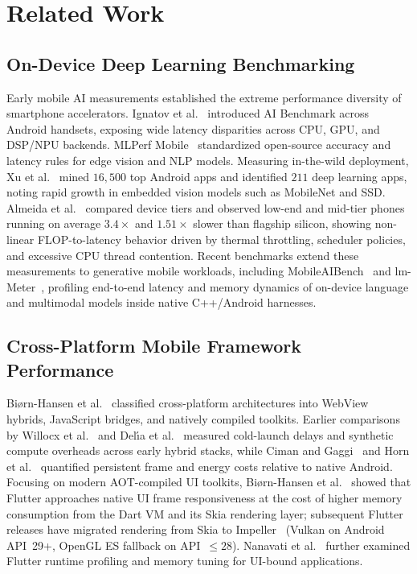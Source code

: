 \section{Related Work}\label{sec:related}

\subsection{On-Device Deep Learning Benchmarking}
Early mobile AI measurements established the extreme performance diversity of smartphone accelerators. Ignatov et al.~\cite{ignatov2018ai,ignatov2019ai} introduced AI Benchmark across Android handsets, exposing wide latency disparities across CPU, GPU, and DSP/NPU backends. MLPerf Mobile~\cite{reddi2020mlperf,reddi2022mlperfmobile} standardized open-source accuracy and latency rules for edge vision and NLP models. Measuring in-the-wild deployment, Xu et al.~\cite{xu2019first} mined $16{,}500$ top Android apps and identified $211$ deep learning apps, noting rapid growth in embedded vision models such as MobileNet and SSD. Almeida et al.~\cite{almeida2021smart} compared device tiers and observed low-end and mid-tier phones running on average $3.4\times$ and $1.51\times$ slower than flagship silicon, showing non-linear FLOP-to-latency behavior driven by thermal throttling, scheduler policies, and excessive CPU thread contention. Recent benchmarks extend these measurements to generative mobile workloads, including MobileAIBench~\cite{murthy2024mobileaibench} and lm-Meter~\cite{wang2025lmmeter}, profiling end-to-end latency and memory dynamics of on-device language and multimodal models inside native C++/Android harnesses.

\subsection{Cross-Platform Mobile Framework Performance}
Bi{\o}rn-Hansen et al.~\cite{biornhansen2019survey} classified cross-platform architectures into WebView hybrids, JavaScript bridges, and natively compiled toolkits. Earlier comparisons by Willocx et al.~\cite{willocx2016comparing} and Del{\'\i}a et al.~\cite{delia2015multi} measured cold-launch delays and synthetic compute overheads across early hybrid stacks, while Ciman and Gaggi~\cite{ciman2017empirical} and Horn et al.~\cite{horn2023native} quantified persistent frame and energy costs relative to native Android. Focusing on modern AOT-compiled UI toolkits, Bi{\o}rn-Hansen et al.~\cite{biornhansen2020empirical} showed that Flutter approaches native UI frame responsiveness at the cost of higher memory consumption from the Dart VM and its Skia rendering layer; subsequent Flutter releases have migrated rendering from Skia to Impeller~\cite{flutterimpeller2025} (Vulkan on Android API~29+, OpenGL ES fallback on API~$\le 28$). Nanavati et al.~\cite{nanavati2024critical} further examined Flutter runtime profiling and memory tuning for UI-bound applications.

